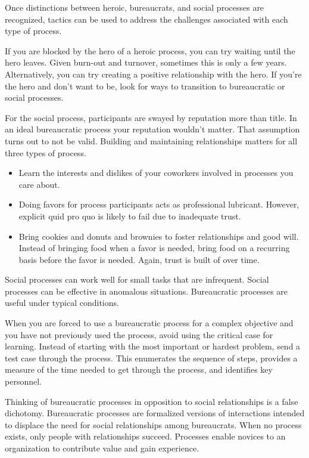 Once distinctions between heroic, bureaucrats, and social processes are recognized, tactics can be used to address the challenges associated with each type of process.

If you are blocked by the hero of a heroic process, you can try waiting until the hero leaves. Given burn-out and turnover, sometimes this is only a few years. Alternatively, you can try creating a positive relationship with the hero.  If you're the hero and don't want to be, look for ways to transition to bureaucratic or social processes. 


For the social process, participants are swayed by reputation more than title. In an ideal bureaucratic process your reputation wouldn't matter. That assumption turns out to not be valid. Building and maintaining relationships matters for all three types of process.
\begin{itemize}
    \item Learn the interests and dislikes of your coworkers involved in processes you care about.
    \item Doing favors for process participants acts as professional lubricant. However, explicit quid pro quo is likely to fail due to inadequate trust. 
    \item Bring cookies and donuts and brownies to foster relationships and good will. 
Instead of bringing food when a favor is needed, bring food on a recurring basis before the favor is needed. Again, trust is built of over time. 
\end{itemize}

Social processes can work well for small tasks that are infrequent.
Social processes can be effective in anomalous situations.
Bureaucratic processes are useful under typical conditions.

When you are forced to use a bureaucratic process for a complex objective and you have not previously used the process, avoid using the critical case for learning. Instead of starting with the most important or hardest problem, send a test case through the process. This enumerates the sequence of steps, provides a measure of the time needed to get through the process, and identifies key personnel. 

Thinking of bureaucratic processes in opposition to social relationships is a false dichotomy. Bureaucratic processes are formalized versions of interactions intended to displace the need for social relationships among bureaucrats.
When no process exists, only people with relationships succeed. Processes enable novices to an organization to contribute value and gain experience. 



